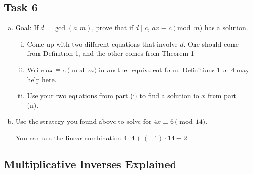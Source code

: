 \documentclass[12pt,letterpaper]{article}
\newcommand\Z{\mathbb Z}
\newif\ifsol
\newcommand{\solu}[2]{ \begin{mdframed} \ifsol #2 \else \vspace{#1} \fi \end{mdframed} }
\begin{document}
    \subsection*{Task 6}
	    \begin{enumerate}[a.]
		\item Goal: If $d = \gcd(a, m)$, prove that if $d \mid c$, $ax \equiv c \pmod{m}$ has a solution.
		
		\begin{enumerate}[i.]
		    \item Come up with two different equations that involve $d$. One should come from Definition 1, and the other comes from Theorem 1.
		    \solu{1cm}{$c = kd$ for some $k \in \Z$ (divisibility)
		    
		    $d = au + mv$ for some $u, v \in \Z$ (the gcd can be written as a linear combination of the two numbers)} 
		    
		    \item Write $ax \equiv c \pmod m$ in another equivalent form. Definitions 1 or 4 may help here.
		    \solu{1cm}{$m \mid c-ax$, or equivalently $c-ax = qm$ for some $q \in \Z$}
		    
		    \item Use your two equations from part (i) to find a solution to $x$ from part (ii).
		    \solu{2cm}{
		    Substituting, we have $c = k(au + mv)$. Rearranging, we get $c - auk = mvk$. Let $x=uk$ and $q = vk$, which forms a solution.
		    }
		\end{enumerate}
		

		\item Use the strategy you found above to solve for $4x \equiv 6 \pmod{14}$.

        You can use the linear combination $4\cdot 4 + (-1)\cdot 14 = 2$.

		\solu{6cm}{
		$\gcd(4, 14) = 2$, and $4\cdot 4 + (-1)\cdot 14 = 2$. $2 \mid 6$ since $2 \cdot 3 = 6$, so we can use the strategy.
		
		So $k=3$, $u=4$, $v=-1$. By part a, $x=k\cdot u=3\cdot 4=12$
		
		To verify: $14 | (6 - 4 \cdot 12) \implies 14 | (6 - 48) \implies 14 | -42$ which is true.
		}
	
	    \end{enumerate}
        
        \pagebreak
        
		\subsection*{Multiplicative Inverses Explained}
\end{document}
